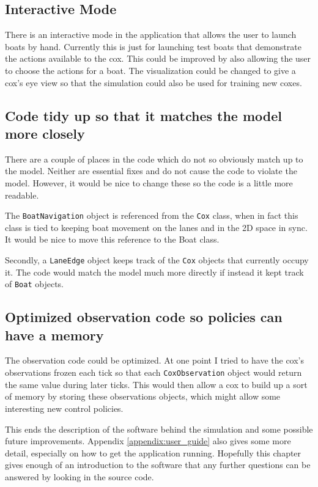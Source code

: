 \subsection{Interactive Mode}
There is an interactive mode in the application that allows the user to launch boats by hand. Currently this is just for launching test boats that demonstrate the actions available to the cox. This could be improved by also allowing the user to choose the actions for a boat. The visualization could be changed to give a cox's eye view so that the simulation could also be used for training new coxes.

\subsection{Code tidy up so that it matches the model more closely}
There are a couple of places in the code which do not so obviously match up to the model. Neither are essential fixes and do not cause the code to violate the model. However, it would be nice to change these so the code is a little more readable. 

The \texttt{BoatNavigation} object is referenced from the \texttt{Cox} class, when in fact this class is tied to keeping boat movement on the lanes and in the 2D space in sync. It would be nice to move this reference to the Boat class.

Secondly, a \texttt{LaneEdge} object keeps track of the \texttt{Cox} objects that currently occupy it. The code would match the model much more directly if instead it kept track of \texttt{Boat} objects.

\subsection{Optimized observation code so policies can have a memory}
The observation code could be optimized. At one point I tried to have the cox's observations frozen each tick so that each \texttt{CoxObservation} object would return the same value during later ticks. This would then allow a cox to build up a sort of memory by storing these observations objects, which might allow some interesting new control policies.


This ends the description of the software behind the simulation and some possible future improvements. Appendix \ref{appendix:user_guide} also gives some more detail, especially on how to get the application running. Hopefully this chapter gives enough of an introduction to the software that any further questions can be answered by looking in the source code.

